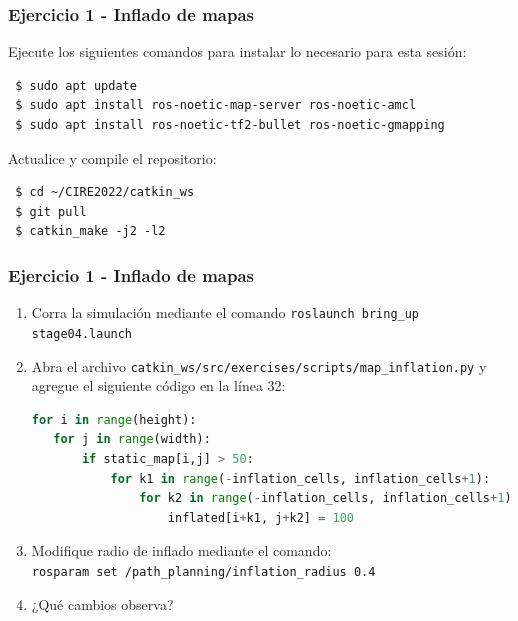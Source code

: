 \documentclass[10pt,spanish,aspectratio=1610]{beamer}
\begin{document}
\begin{frame}[containsverbatim]\frametitle{Ejercicio 1 - Inflado de mapas}
  Ejecute los siguientes comandos para instalar lo necesario para esta sesión:
  \begin{verbatim}
 $ sudo apt update
 $ sudo apt install ros-noetic-map-server ros-noetic-amcl 
 $ sudo apt install ros-noetic-tf2-bullet ros-noetic-gmapping
\end{verbatim}
  Actualice y compile el repositorio:
  \begin{verbatim}
 $ cd ~/CIRE2022/catkin_ws
 $ git pull
 $ catkin_make -j2 -l2
\end{verbatim}
\end{frame}

\begin{frame}[containsverbatim]\frametitle{Ejercicio 1 - Inflado de mapas}
  \begin{enumerate}
    \item Corra la simulación mediante el comando \texttt{roslaunch bring\_up stage04.launch}
    \item Abra el archivo \texttt{catkin\_ws/src/exercises/scripts/map\_inflation.py} y agregue el siguiente código en la línea 32:
    \begin{lstlisting}[language=Python,firstnumber=32]
 for i in range(height):
   for j in range(width):
       if static_map[i,j] > 50:
           for k1 in range(-inflation_cells, inflation_cells+1):
               for k2 in range(-inflation_cells, inflation_cells+1):
                   inflated[i+k1, j+k2] = 100
    \end{lstlisting}
  \item Modifique radio de inflado mediante el comando:
    \[\]
    \texttt{rosparam set /path\_planning/inflation\_radius 0.4}
    \[\]
  \item ¿Qué cambios observa?
  \end{enumerate}

\end{frame}
\end{document}
